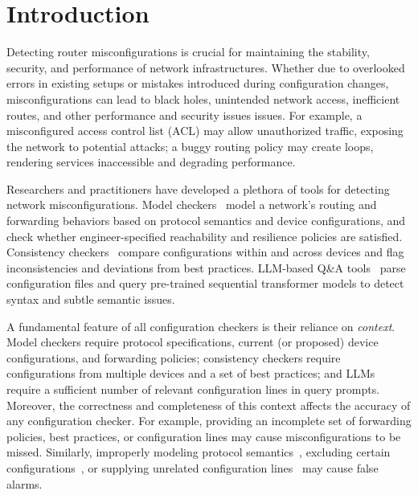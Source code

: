 
\section{Introduction}
\label{sec:intro}

Detecting router misconfigurations is crucial for maintaining the stability,
security, and performance of network infrastructures. Whether due to
overlooked errors in existing setups or mistakes introduced during
configuration changes, misconfigurations can lead to black holes, unintended
network access, inefficient routes, and other performance and security issues
issues.  For example, a misconfigured access control list (ACL) may allow
unauthorized traffic, exposing the network to potential attacks; a buggy
routing policy may create loops, rendering services inaccessible and degrading
performance.

Researchers and practitioners have developed a plethora of tools for detecting
network misconfigurations. Model checkers~\cite{fogel2015general,
beckett2017general, abhashkumar2020tiramisu, prabhu2020plankton, zhang2022sre,
steffen2020netdice, ye2020hoyan, ritchey2000using,al2011configchecker,
jeffrey2009model} model a network's routing and forwarding behaviors based on
protocol semantics and device configurations, and check whether
engineer-specified reachability and resilience policies are satisfied.
Consistency checkers~\cite{kakarla2024diffy, kakarla2020finding,
le2006minerals, feamster2005detecting,
tang2021campion,le2008detecting,le2006characterization} compare configurations
within and across devices and flag inconsistencies and deviations from best
practices. LLM-based Q\&A
tools~\cite{bogdanov2024leveraging,chen2024automatic,wang2024identifying,liu2024large,
wang2024netconfeval, lian2023configuration} parse configuration files and
query pre-trained sequential transformer models to detect syntax and subtle
semantic issues.

A fundamental feature of all configuration checkers is their reliance on {\em
context}. Model checkers require protocol specifications, current (or
proposed) device configurations, and forwarding policies; consistency checkers
require configurations from multiple devices and a set of best practices; and
LLMs require a sufficient number of relevant configuration lines in query
prompts. Moreover, the correctness and completeness of this context affects 
the accuracy of any configuration checker. For example, providing an incomplete set of
forwarding policies, best practices, or configuration lines
may cause misconfigurations to be missed. Similarly, improperly modeling
protocol semantics~\cite{birkner2021metha, ye2020hoyan}, excluding certain
configurations~\cite{xu2023netcov}, or supplying unrelated configuration
lines~\cite{liskavets2024prompt,tian2024examining,khurana2024and,
shvartzshnaider2024llm} may cause false alarms.

